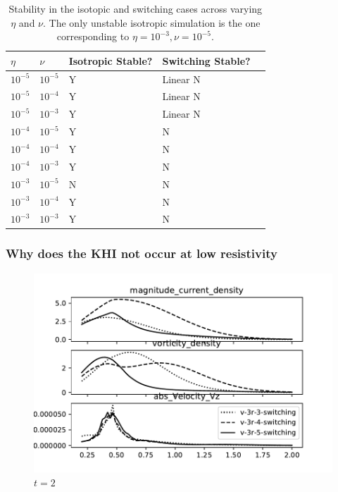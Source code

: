 \begin{table}[]
\centering
\begin{tabular}{lllll}
$\eta$    & $\nu$     & Isotropic Stable? & Switching Stable? &  \\
\midrule
$10^{-5}$ & $10^{-5}$ & Y                 & Linear N          &  \\
$10^{-5}$ & $10^{-4}$ & Y                 & Linear N          &  \\
$10^{-5}$ & $10^{-3}$ & Y                 & Linear N          &  \\
$10^{-4}$ & $10^{-5}$ & Y                 & N                 &  \\
$10^{-4}$ & $10^{-4}$ & Y                 & N                 &  \\
$10^{-4}$ & $10^{-3}$ & Y                 & N                 &  \\
$10^{-3}$ & $10^{-5}$ & N                 & N                 &  \\
$10^{-3}$ & $10^{-4}$ & Y                 & N                 &  \\
$10^{-3}$ & $10^{-3}$ & Y                 & N                 & 
\end{tabular}
\caption{Stability in the isotopic and switching cases across varying $\eta$ and $\nu$. The only unstable isotropic simulation is the one corresponding to $\eta = 10^{-3}, \nu = 10^{-5}$.}
\label{tab:stability}
\end{table}

\subsubsection{Why does the KHI not occur at low resistivity}

\begin{figure}[h]
  \centering
  \includegraphics[width=0.8\linewidth]{./images/null_point_khi/azimuthal_averages_v-3_2.pdf}
  \caption{$t=2$}%
  \label{fig:azimuthal_averages_v-3_2}
\end{figure}

